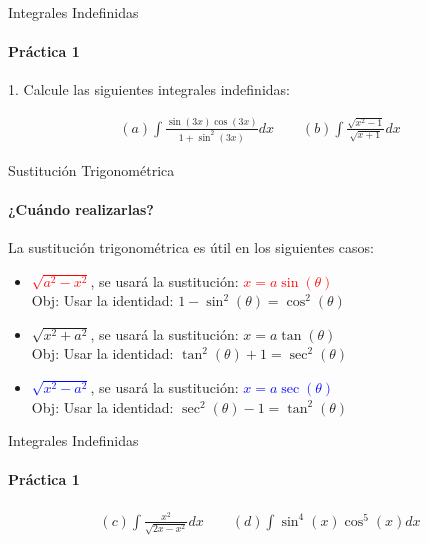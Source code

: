 \documentclass{plantillaPPT}
\begin{document}
\primeraDiapo

\begin{frame}{Integrales Indefinidas}
    \framesubtitle{Práctica 1}

    1. Calcule las siguientes integrales indefinidas:

    \begin{align*}
    (a)\int \frac{\sin(3x)\cos(3x)}{1+\sin^2(3x)}dx \qquad
    (b)\int \frac{\sqrt{x^2-1}}{\sqrt{x+1}}dx
    \end{align*}

\end{frame}

\begin{frame}{Sustitución Trigonométrica}
    \framesubtitle{¿Cuándo realizarlas?}

    La sustitución trigonométrica es útil en los siguientes casos:
    \vspace{0.5cm}

    \begin{itemize}
        \item \textcolor{red}{\(\sqrt{a^2-x^2}\)}, se usará la %
        sustitución: \textcolor{red}{\(x=a\sin(\theta)\)} \\
        Obj: Usar la identidad: \(1-\sin^2(\theta)=\cos^2(\theta)\)
        \vspace{0.25cm}
        \item \textcolor{green!50!black}{\(\sqrt{x^2+a^2}\)}, se usará la sustitución: \textcolor{green!40!black}{\(x=a\tan(\theta)\)} \\
        Obj: Usar la identidad: \(\tan^2(\theta)+1=\sec^2(\theta)\)
        \vspace{0.25cm}
        \item  \textcolor{blue}{\(\sqrt{x^2-a^2}\)}, se usará la sustitución: \textcolor{blue}{\(x=a\sec(\theta)\)} \\
        Obj: Usar la identidad: \(\sec^2(\theta)-1=\tan^2(\theta)\)
    \end{itemize}
    
\end{frame}

\begin{frame}{Integrales Indefinidas}

    \framesubtitle{Práctica 1}
    
    \begin{align*}
        (c)\int \frac{x^2}{\sqrt{2x-x^2}}dx \qquad
        (d)\int \sin^4(x)\cos^5(x)dx
    \end{align*}
    
\end{frame}
\end{document}
